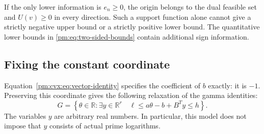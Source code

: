 \documentclass[11pt,a4paper]{article}
\newcommand{\R}{\mathbb R}
\theoremstyle{definition}
\theoremstyle{remark}
\numberwithin{equation}{section}
\begin{document}
If the only lower information is $e_n\ge0$, the origin belongs to
the dual feasible set and $U(v)\ge0$ in every direction.  Such a
support function alone cannot give a strictly negative upper bound
or a strictly positive lower bound.  The quantitative lower bounds
in \eqref{pm:eq:two-sided-bounds} contain additional sign information.

\subsection{Fixing the constant coordinate}

Equation~\eqref{pm:cvx:eq:vector-identity} specifies the coefficient
of $b$ exactly: it is $-1$.  Preserving this coordinate gives the
following relaxation of the gamma identities:
\begin{equation}\label{pm:cvx:eq:G}
 G=\left\{\theta\in\R:
   \exists y\in\R^r\quad
   \ell\le a\theta-b+B^Ty\le h\right\}.
\end{equation}
The variables $y$ are arbitrary real numbers.  In particular, this
model does not impose that $y$ consists of actual prime logarithms.
\end{document}
